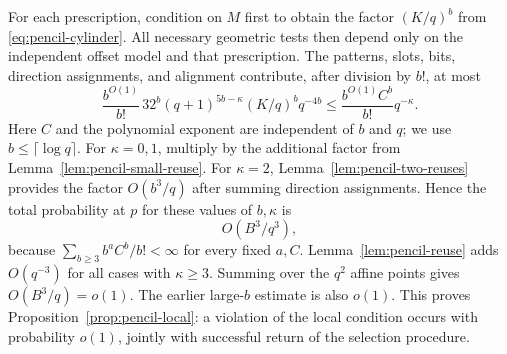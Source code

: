 For each prescription, condition on $M$ first to obtain the factor
$(K/q)^b$ from \eqref{eq:pencil-cylinder}.  All necessary geometric tests
then depend only on the independent offset model and that prescription.
The patterns, slots, bits, direction assignments, and alignment contribute,
after division by $b!$, at most
\begin{equation}\label{eq:pencil-common-factor}
 \frac{b^{O(1)}}{b!}\,32^b(q+1)^{5b-\kappa}
       (K/q)^b q^{-4b}
 \le \frac{b^{O(1)}C^b}{b!}q^{-\kappa}.
\end{equation}
Here $C$ and the polynomial exponent are independent of $b$ and $q$;
we use $b\le\lceil\log q\rceil$.  For $\kappa=0,1$, multiply by the
additional factor from Lemma~\ref{lem:pencil-small-reuse}.  For $\kappa=2$,
Lemma~\ref{lem:pencil-two-reuses} provides the factor $O(b^3/q)$ after
summing direction assignments.  Hence the total probability at $p$ for
these values of $b,\kappa$ is
\[
 O(B^3/q^3),
\]
because $\sum_{b\ge3} b^a C^b/b!<\infty$ for every fixed $a,C$.
Lemma~\ref{lem:pencil-reuse} adds $O(q^{-3})$ for all cases with
$\kappa\ge3$.  Summing over the $q^2$ affine points gives
$O(B^3/q)=o(1)$.  The earlier large-$b$ estimate is also $o(1)$.
This proves Proposition~\ref{prop:pencil-local}: a violation of the local
condition occurs with probability $o(1)$, jointly with successful return
of the selection procedure.
